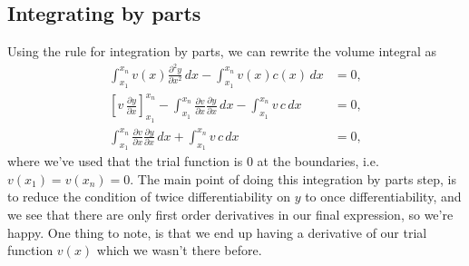 \documentclass[acmtog]{acmart}
\begin{document}
\subsection{Integrating by parts}
Using the rule for integration by parts, we can rewrite the volume integral as
%
\begin{align}
  \int_{x_1}^{x_n} v(x)\frac{ \partial^{2} y }{ \partial x^{2} }\,dx - \int_{x_1}^{x_n} v(x) c(x) \, dx                                                                                         & = 0, \\
  \left[v \, \frac{ \partial y }{ \partial x } \right]_{x_1}^{x_n} - \int_{x_1}^{x_n} \frac{ \partial v }{ \partial x } \frac{ \partial y }{ \partial x } \, dx - \int_{x_1}^{x_n} v \, c \, dx & = 0, \\
  \int_{x_1}^{x_n} \frac{ \partial v }{ \partial x } \frac{ \partial y }{ \partial x } \, dx + \int_{x_1}^{x_n} v \, c \, dx                                                                    & = 0,
\end{align}
%
where we've used that the trial function is 0 at the boundaries, i.e. $v(x_1) =
  v(x_n) = 0$. The main point of doing this integration by parts step, is to
reduce the condition of twice differentiability on $y$ to once
differentiability, and we see that there are only first order derivatives in
our final expression, so we're happy. One thing to note, is that we end up having a derivative of our trial function $v(x)$ which we wasn't there before.
\end{document}
